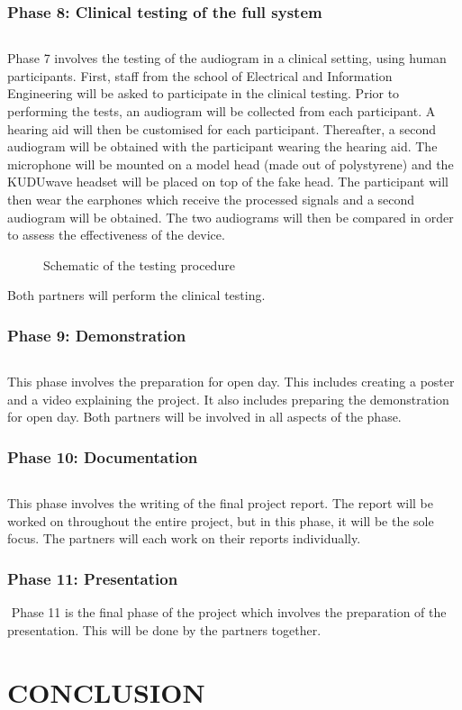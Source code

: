 \documentclass[10pt,twocolumn]{witseiepaper}
\begin{document}
\subsubsection*{Phase 8: Clinical testing of the full system} $    $

Phase 7 involves the testing of the audiogram in a clinical setting, using human participants. First, staff from the school of Electrical and Information Engineering will be asked to participate in the clinical testing. Prior to performing the tests, an audiogram will be collected from each participant. A hearing aid will then be customised for each participant. Thereafter, a second audiogram will be obtained with the participant wearing the hearing aid. The microphone will be mounted on a model head (made out of polystyrene) and the KUDUwave headset will be placed on top of the fake head. The participant will then wear the earphones which receive the processed signals and a second audiogram will be obtained. The two audiograms will then be compared in order to assess the effectiveness of the device.

\begin{figure}[h]
	\centering
	\caption{Schematic of the testing procedure}
	\raggedright
	\label{fig:testing}	
\end{figure}

Both partners will perform the clinical testing.

\subsubsection*{Phase 9: Demonstration} $    $

This phase involves the preparation for open day. This includes creating a poster and a video explaining the project. It also includes preparing the demonstration for open day. Both partners will be involved in all aspects of the phase.

\subsubsection*{Phase 10: Documentation} $    $

This phase involves the writing of the final project report. The report will be worked on throughout the entire project, but in this phase, it will be the sole focus. The partners will each work on their reports individually.

\subsubsection*{Phase 11: Presentation} $    $
Phase 11 is the final phase of the project which involves the preparation of the presentation. This will be done by the partners together.

\section{CONCLUSION}




\end{document}

